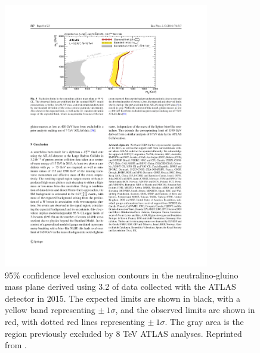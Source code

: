 \begin{figure}[h]
\begin{center}
\includegraphics[width=0.8\textwidth]{Figures/Theory/2015ATLAS.pdf}
\end{center}
    \caption[95\% confidence level exclusion contours in the neutralino-gluino mass plane derived using 3.2 \fbinv of data collected with the ATLAS detector in 2015.]
    {95\% confidence level exclusion contours in the neutralino-gluino mass plane derived using 3.2 \fbinv of data collected with the ATLAS detector in 2015. The expected limits are shown in black, with a yellow band representing $\pm~1\sigma$, and the observed limits are shown in red, with dotted red lines representing $\pm~1\sigma$. The gray area is the region previously excluded by 8 TeV ATLAS analyses. Reprinted from \cite{ATLAS:2016aa}.}
    \label{fig:Limits2015ATLAS}
\end{figure}


